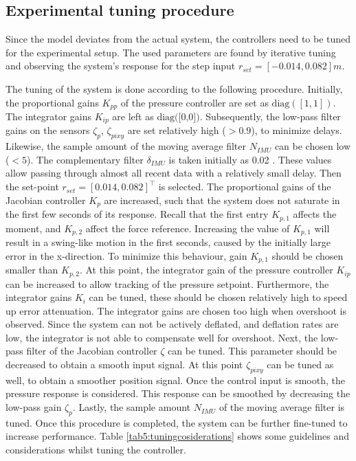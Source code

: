 \subsection*{Experimental tuning procedure}

Since the model deviates from the actual system, the controllers need to be tuned for the experimental setup. The used parameters are found by iterative tuning and observing the system's response for the step input $r_{set} = [-0.014,0.082]m$. 

The tuning of the system is done according to the following procedure. Initially, the proportional gains $K_{pp}$ of the pressure controller are set as $\text{diag}([1,1])$. The integrator gains $K_{ip}$ are left as $\text{diag([0,0])}$. Subsequently, the low-pass filter gains on the sensors $\zeta_p$, $\zeta_{pixy}$ are set relatively high ($>0.9$), to minimize delays. Likewise, the sample amount of the moving average filter $N_{IMU}$ can be chosen low ($<5$). The complementary filter $\delta_{IMU}$ is taken initially as 0.02 \cite{compfilter}. These values allow passing through almost all recent data with a relatively small delay. Then the set-point $r_{set} = [0.014,0.082]^\top$ is selected. The proportional gains of the Jacobian controller $K_p$ are increased, such that the system does not saturate in the first few seconds of its response. Recall that the first entry $K_{p,1}$ affects the moment, and $K_{p,2}$ affect the force reference. Increasing the value of $K_{p,1}$ will result in a swing-like motion in the first seconds, caused by the initially large error in the x-direction. To minimize this behaviour, gain $K_{p,1}$ should be chosen smaller than $K_{p,2}$. At this point, the integrator gain of the pressure controller $K_{ip}$ can be increased to allow tracking of the pressure setpoint. Furthermore, the integrator gains $K_i$ can be tuned, these should be chosen relatively high to speed up error attenuation. The integrator gains are chosen too high when overshoot is observed. Since the system can not be actively deflated, and deflation rates are low, the integrator is not able to compensate well for overshoot. Next, the low-pass filter of the Jacobian controller $\zeta$ can be tuned. This parameter should be decreased to obtain a smooth input signal. At this point $\zeta_{pixy}$ can be tuned as well, to obtain a smoother position signal. Once the control input is smooth, the pressure response is considered. This response can be smoothed by decreasing the low-pass gain $\zeta_p$. Lastly, the sample amount $N_{IMU}$ of the moving average filter is tuned. Once this procedure is completed, the system can be further fine-tuned to increase performance. Table \ref{tab5:tuningcosiderations} shows some guidelines and considerations whilst tuning the controller.



